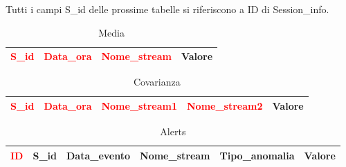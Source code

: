 \documentclass{article}
\begin{document}
\vspace{2pt}
Tutti i campi S\_id delle prossime tabelle si riferiscono a ID di Session\_info.
\vspace{2pt}

\begin{table}[H]
    \centering
    \begin{tabular}{|c|c|c|c|}
        \hline
        \textcolor{red}{S\_id} & \textcolor{red}{Data\_ora} & \textcolor{red}{Nome\_stream} & Valore\\
        \hline
    \end{tabular}
    \caption{Media}
    \label{tab:media}
\end{table}

\vspace{2pt}

\begin{table}[H]
    \centering
    \begin{tabular}{|c|c|c|c|c|}
        \hline
         \textcolor{red}{S\_id} & \textcolor{red}{Data\_ora} & \textcolor{red}{Nome\_stream1} & \textcolor{red}{Nome\_stream2} & Valore\\
        \hline
    \end{tabular}
    \caption{Covarianza}
    \label{tab:covarianza}
\end{table}

\vspace{2pt}

\begin{table}[H]
    \centering
    \begin{tabular}{|c|c|c|c|c|c|}
        \hline
        \textcolor{red}{ID} & S\_id & Data\_evento & Nome\_stream & Tipo\_anomalia & Valore\\
        \hline
    \end{tabular}
    \caption{Alerts}
    \label{tab:alerts}
\end{table}

\vspace{2pt}

\begin{table}[H]
    \centering
    \caption{Log\_monitor}
    \label{tab:log_monitor}
\end{table}
\end{document}

